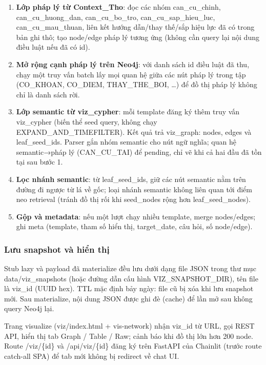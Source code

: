 \documentclass[../DoAn.tex]{subfiles}
\begin{document}
\begin{enumerate}[label=\textbf{Bước \arabic*.}, leftmargin=1.6cm]
    \item \textbf{Lớp pháp lý từ Context\_Tho}: đọc các nhóm can\_cu\_chinh, can\_cu\_huong\_dan, can\_cu\_bo\_tro, can\_cu\_sap\_hieu\_luc, can\_cu\_mau\_thuan, liên kết hướng dẫn/thay thế/sắp hiệu lực đã có trong bản ghi thô; tạo node/edge pháp lý tương ứng (không cần query lại nội dung điều luật nếu đã có id).
    \item \textbf{Mở rộng cạnh pháp lý trên Neo4j}: với danh sách id điều luật đã thu, chạy một truy vấn batch lấy mọi quan hệ giữa các nút pháp lý trong tập (CO\_KHOAN, CO\_DIEM, THAY\_THE\_BOI, \ldots) để đồ thị pháp lý không chỉ là danh sách rời.
    \item \textbf{Lớp semantic từ viz\_cypher}: mỗi template đăng ký thêm truy vấn viz\_cypher (biến thể seed query, không chạy EXPAND\_AND\_TIMEFILTER). Kết quả trả viz\_graph: nodes, edges và leaf\_seed\_ids. Parser gắn nhóm semantic cho nút ngữ nghĩa; quan hệ semantic→pháp lý (CAN\_CU\_TAI) để pending, chỉ vẽ khi cả hai đầu đã tồn tại sau bước 1.
    \item \textbf{Lọc nhánh semantic}: từ leaf\_seed\_ids, giữ các nút semantic nằm trên đường đi ngược từ lá về gốc; loại nhánh semantic không liên quan tới điểm neo retrieval (tránh đồ thị rối khi seed\_nodes rộng hơn leaf\_seed\_nodes).
    \item \textbf{Gộp và metadata}: nếu một lượt chạy nhiều template, merge nodes/edges; ghi meta (template, tham số hiển thị, target\_date, câu hỏi, số node/edge).
\end{enumerate}

\subsubsection{Lưu snapshot và hiển thị}

Stub lazy và payload đã materialize đều lưu dưới dạng file JSON trong thư mục data/viz\_snapshots (hoặc đường dẫn cấu hình VIZ\_SNAPSHOT\_DIR), tên file là viz\_id (UUID hex). TTL mặc định bảy ngày: file cũ bị xóa khi lưu snapshot mới. Sau materialize, nội dung JSON được ghi đè (cache) để lần mở sau không query Neo4j lại.

Trang visualize (viz/index.html + vis-network) nhận viz\_id từ URL, gọi REST API, hiển thị tab Graph / Table / Raw; cảnh báo khi đồ thị lớn hơn 200 node. Route /viz/\{id\} và /api/viz/\{id\} đăng ký trên FastAPI của Chainlit (trước route catch-all SPA) để tab mới không bị redirect về chat UI.
\end{document}
